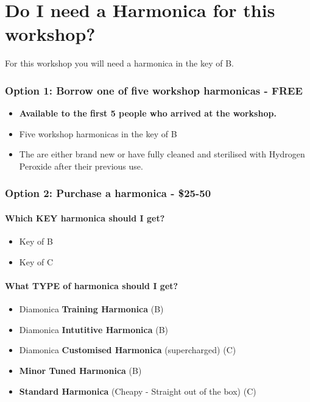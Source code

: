 \part*{Do I need a Harmonica for this workshop?}
For this workshop you will need a harmonica in the key of B.

\section*{Option 1: Borrow one of five workshop harmonicas - FREE}
    \begin{itemize}
        \item \textbf{Available to the first 5 people who arrived at the workshop.}
        \item Five workshop harmonicas in the key of B
        \item The are either brand new or have fully cleaned and sterilised with Hydrogen Peroxide after their previous use.
    \end{itemize}
    
\section*{Option 2: Purchase a harmonica - \$25-50}
    \subsection*{Which KEY harmonica should I get?}
        \begin{itemize}
            \item Key of B  
            \item Key of C
        \end{itemize}
    \subsection*{What TYPE of harmonica should I get?}
        \begin{itemize}
            \item Diamonica \textbf{Training Harmonica} (B)
            \item Diamonica \textbf{Intutitive Harmonica} (B)
            \item Diamonica \textbf{Customised Harmonica} (supercharged) (C)
            \item \textbf{Minor Tuned Harmonica} (B)
            \item \textbf{Standard Harmonica} (Cheapy - Straight out of the box) (C)
        \end{itemize}


